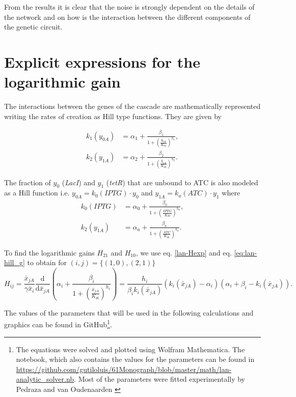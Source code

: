 From the results it is clear that the noise is strongly dependent on the details of the network and on how is the interaction between the different components of the genetic circuit.

\section{Explicit expressions for the logarithmic gain}

The interactions between the genes of the cascade are mathematically represented writing the rates of creation as Hill type functions. They are given by

\begin{equation}
  \label{eq:lan-hill_g}
  \begin{split}
    k_1(y_{0A}) &= \alpha_1 + \frac{\beta_1}{1+(\frac{y_{0A}}{K_{d1}})^{h_1}},\\
    k_2(y_{1A}) &= \alpha_2 + \frac{\beta_2}{1+(\frac{y_{1A}}{K_{d2}})^{h_2}}.
\end{split}
\end{equation}

The fraction of $y_0$ (\textit{LacI}) and $y_1$ (\textit{tetR}) that are unbound to ATC is also modeled as a Hill function i.e. $y_{0A} = k_0(IPTG)\cdot y_0$ and $y_{1A} = k_a(ATC)\cdot y_1$ where
\begin{equation}
  \begin{split}
    k_0(IPTG) &= \alpha_0 + \frac{\beta_0}{1+(\frac{IPTG}{K_{d0}})^{h_0}},\\
    k_2(y_{1A}) &= \alpha_a + \frac{\beta_a}{1+(\frac{ATC}{K_{da}})^{h_a}}.
\end{split}
  \end{equation}

To find the logarithmic gains $H_{21}$ and $H_{10}$, we use eq. \eqref{lan-Hexp} and eq. \eqref{eq:lan-hill_g} to obtain for $(i,j) = \{(1,0),(2,1)\}$
\begin{equation}
  \label{eq:lan-H_det}
  H_{ij} = \frac{\bar{x}_{jA}}{\gamma\bar{x}_i}\frac{\mathrm{d}}{\mathrm{d} \bar{x}_{jA}}\left( \alpha_i + \frac{\beta_i}{1+(\frac{\bar{x}_{jA}}{K_{di}})^{h_i}}\right) = \frac{h_i}{\beta_i k_i(\bar{x}_{jA})}\left(k_i(\bar{x}_{jA}) - \alpha_i\right) \left(\alpha_i+\beta_i-k_i(\bar{x}_{jA})\right).
\end{equation}

The values of the parameters that will be used in the following calculations and graphics can be found in GitHub\footnote{The equations were solved and plotted using Wolfram Mathematica. The notebook, which also contains the values for the parameters can be found in \url{https://github.com/gutiloluis/61Monograph/blob/master/math/lan-analytic_solver.nb}. Most of the parameters were fitted experimentally by Pedraza and van Oudenaarden \cite{pedraza05}}.


